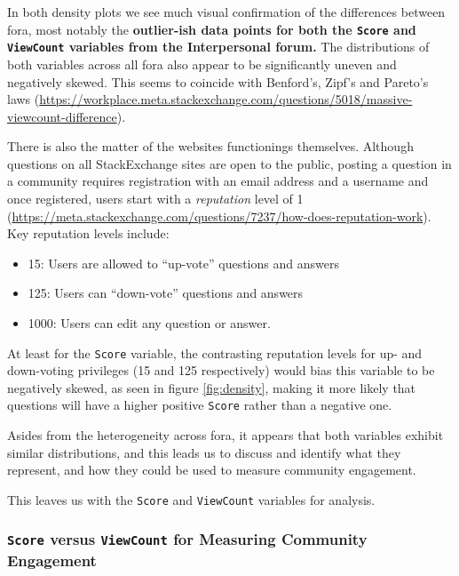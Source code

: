 \documentclass[11pt,preprint, authoryear]{article}
\numberwithin{equation}{section}
\begin{document}
\normalsize

In both density plots we see much visual confirmation of the differences
between fora, most notably the \textbf{outlier-ish data points for both
the \texttt{Score} and \texttt{ViewCount} variables from the
Interpersonal forum.} The distributions of both variables across all
fora also appear to be significantly uneven and negatively skewed. This
seems to coincide with Benford's, Zipf's and Pareto's laws
(\url{https://workplace.meta.stackexchange.com/questions/5018/massive-viewcount-difference}).

There is also the matter of the websites functionings themselves.
Although questions on all StackExchange sites are open to the public,
posting a question in a community requires registration with an email
address and a username and once registered, users start with a
\emph{reputation} level of 1
(\url{https://meta.stackexchange.com/questions/7237/how-does-reputation-work}).
Key reputation levels include:


\begin{itemize}
\item
  15: Users are allowed to ``up-vote'' questions and answers
\item
  125: Users can ``down-vote'' questions and answers
\item
  1000: Users can edit any question or answer.
\end{itemize}


At least for the \texttt{Score} variable, the contrasting reputation
levels for up- and down-voting privileges (15 and 125 respectively)
would bias this variable to be negatively skewed, as seen in figure
\ref{fig:density}, making it more likely that questions will have a
higher positive \texttt{Score} rather than a negative one.

Asides from the heterogeneity across fora, it appears that both
variables exhibit similar distributions, and this leads us to discuss
and identify what they represent, and how they could be used to measure
community engagement.

This leaves us with the \texttt{Score} and \texttt{ViewCount} variables
for analysis.

\newpage

\subsubsection{\texorpdfstring{\texttt{Score} versus \texttt{ViewCount}
for Measuring Community
Engagement}{Score versus ViewCount for Measuring Community Engagement}}\label{score-versus-viewcount-for-measuring-community-engagement}
\end{document}
